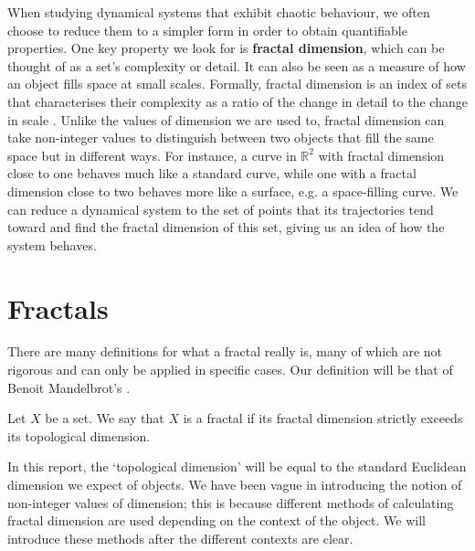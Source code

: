 
When studying dynamical systems that exhibit chaotic behaviour, we often choose to reduce them to a simpler form in order to obtain quantifiable properties. One key property we look for is \textbf{fractal dimension}, which can be thought of as a set's complexity or detail. It can also be seen as a measure of how an object fills space at small scales. Formally, fractal dimension is an index of sets that characterises their complexity as a ratio of the change in detail to the change in scale \cite{mandelbrot1983fractal}. Unlike the values of dimension we are used to, fractal dimension can take non-integer values to distinguish between two objects that fill the same space but in different ways. For instance, a curve in $\mathbb{R}^2$ with fractal dimension close to one behaves much like a standard curve, while one with a fractal dimension close to two behaves more like a surface, e.g. a space-filling curve. We can reduce a dynamical system to the set of points that its trajectories tend toward and find the fractal dimension of this set, giving us an idea of how the system behaves.

\section{Fractals}
There are many definitions for what a fractal really is, many of which are not rigorous and can only be applied in specific cases. Our definition will be that of Benoit Mandelbrot's \cite{mandelbrot1983fractal}.
\begin{defn}
    Let $X$ be a set. We say that $X$ is a fractal if its fractal dimension strictly exceeds its topological dimension.
\end{defn}
In this report, the `topological dimension' will be equal to the standard Euclidean dimension we expect of objects. We have been vague in introducing the notion of non-integer values of dimension; this is because different methods of calculating fractal dimension are used depending on the context of the object. We will introduce these methods after the different contexts are clear.

